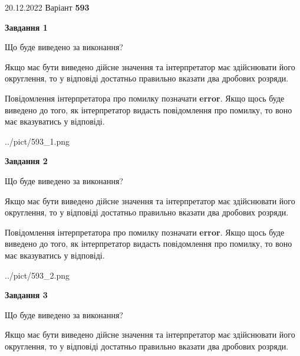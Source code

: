 \documentclass[12pt, ukrainian]{article}
\begin{document}
{20.12.2022 Варіант \No \textbf { 593 }\par}
{
\begin {Large}

{\begin {center}\textbf{Завдання 1}\end {center}}\par
Що буде виведено за виконання? \par

Якщо має бути виведено дійсне значення та інтерпретатор має здійснювати його округлення, 
то у відповіді достатньо правильно вказати два дробових розряди.

Повідомлення інтерпретатора про помилку позначати \textbf{error}.
Якщо щось буде виведено до того, як інтерпретатор видасть повідомлення про помилку, 
то воно має вказуватись у відповіді. \par

\begin{center}
	{../pict/593_1.png}
\end{center}
\newpage

{\begin {center}\textbf{Завдання 2}\end {center}}\par
Що буде виведено за виконання? \par

Якщо має бути виведено дійсне значення та інтерпретатор має здійснювати його округлення, 
то у відповіді достатньо правильно вказати два дробових розряди.

Повідомлення інтерпретатора про помилку позначати \textbf{error}.
Якщо щось буде виведено до того, як інтерпретатор видасть повідомлення про помилку, 
то воно має вказуватись у відповіді. \par

\begin{center}
	{../pict/593_2.png}
\end{center}
\newpage

{\begin {center}\textbf{Завдання 3}\end {center}}\par
Що буде виведено за виконання? \par

Якщо має бути виведено дійсне значення та інтерпретатор має здійснювати його округлення, 
то у відповіді достатньо правильно вказати два дробових розряди.


\end{Large}}
\end{document}
